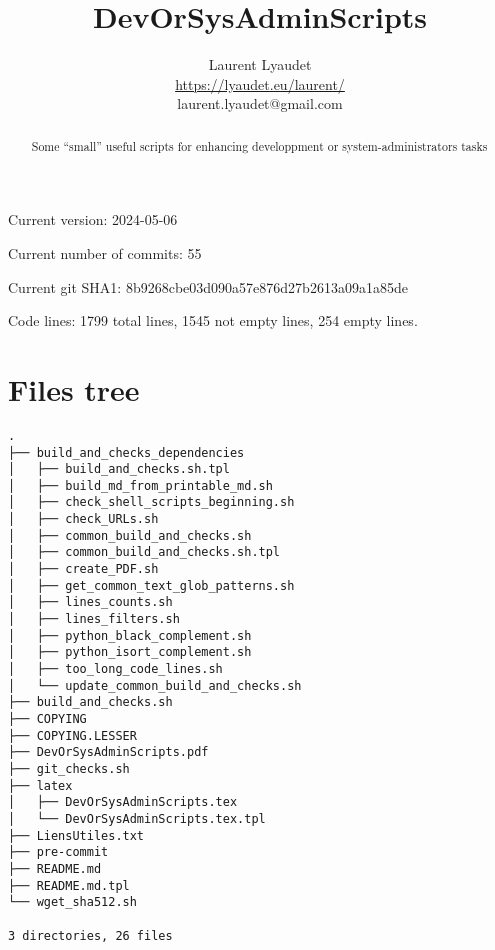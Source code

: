 \documentclass{article}
\begin{document}
\author{
  Laurent Lyaudet\\
  \url{https://lyaudet.eu/laurent/}\\
  laurent.lyaudet@gmail.com
}
\title{DevOrSysAdminScripts}

\maketitle
\begin{abstract}
Some ``small'' useful scripts
for enhancing developpment or system-administrators tasks
\end{abstract}

Current version: 2024-05-06

Current number of commits: 55

Current git SHA1: 8b9268cbe03d090a57e876d27b2613a09a1a85de

Code lines: 1799 total lines, 1545 not empty lines, 254 empty lines.

\section{Files tree}
\label{section:tree}

\begin{verbatim}
.
├── build_and_checks_dependencies
│   ├── build_and_checks.sh.tpl
│   ├── build_md_from_printable_md.sh
│   ├── check_shell_scripts_beginning.sh
│   ├── check_URLs.sh
│   ├── common_build_and_checks.sh
│   ├── common_build_and_checks.sh.tpl
│   ├── create_PDF.sh
│   ├── get_common_text_glob_patterns.sh
│   ├── lines_counts.sh
│   ├── lines_filters.sh
│   ├── python_black_complement.sh
│   ├── python_isort_complement.sh
│   ├── too_long_code_lines.sh
│   └── update_common_build_and_checks.sh
├── build_and_checks.sh
├── COPYING
├── COPYING.LESSER
├── DevOrSysAdminScripts.pdf
├── git_checks.sh
├── latex
│   ├── DevOrSysAdminScripts.tex
│   └── DevOrSysAdminScripts.tex.tpl
├── LiensUtiles.txt
├── pre-commit
├── README.md
├── README.md.tpl
└── wget_sha512.sh

3 directories, 26 files
\end{verbatim}
\end{document}
